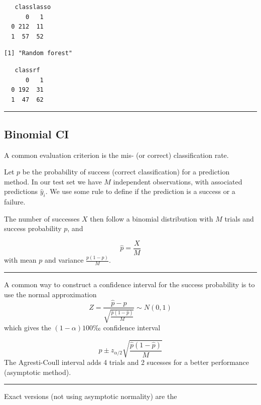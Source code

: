 \documentclass[
  letterpaper,
  DIV=11,
  numbers=noendperiod]{scrartcl}
\begin{document}
\begin{verbatim}
   classlasso
      0   1
  0 212  11
  1  57  52
\end{verbatim}

\begin{verbatim}
[1] "Random forest"
\end{verbatim}

\begin{verbatim}
   classrf
      0   1
  0 192  31
  1  47  62
\end{verbatim}

\begin{center}\rule{0.5\linewidth}{0.5pt}\end{center}

\hypertarget{binomial-ci}{%
\subsection{Binomial CI}\label{binomial-ci}}

A common evaluation criterion is the mis- (or correct) classification
rate.

Let \(p\) be the probability of success (correct classification) for a
prediction method. In our test set we have \(M\) independent
observations, with associated predictions \(\hat{y}_i\). We use some
rule to define if the prediction is a success or a failure.

The number of successes \(X\) then follow a binomial distribution with
\(M\) trials and success probability \(p\), and

\[\hat{p}=\frac{X}{M}\] with mean \(p\) and variance
\(\frac{p(1-p)}{M}\).

\begin{center}\rule{0.5\linewidth}{0.5pt}\end{center}

A common way to construct a confidence interval for the success
probability is to use the normal approximation
\[ Z=\frac{\hat{p}-p}{\sqrt{\frac{\hat{p}(1-\hat{p})}{M}}} \sim N(0,1)\]
which gives the \((1-\alpha)100‰\) confidence interval

\[ \hat{p}\pm z_{\alpha/2}\sqrt{\frac{\hat{p}(1-\hat{p})}{M}}\] The
Agresti-Coull interval adds 4 trials and 2 sucesses for a better
performance (asymptotic method).

\begin{center}\rule{0.5\linewidth}{0.5pt}\end{center}

Exact versions (not using asymptotic normality) are the
\end{document}
